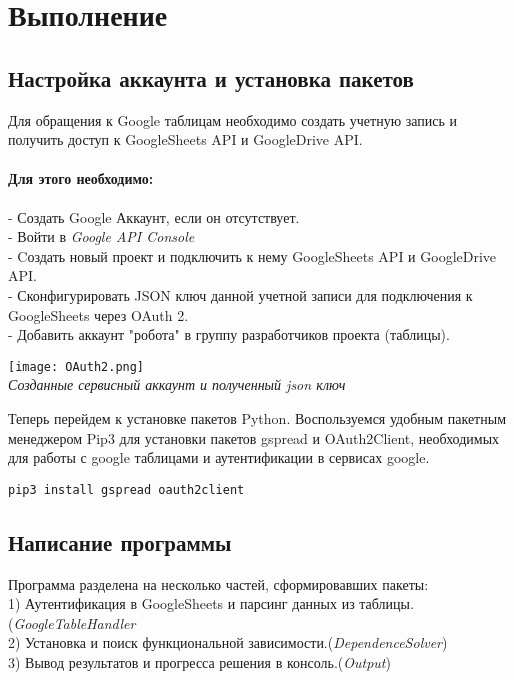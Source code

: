 \newpage
	\section*{\centering Выполнение}
	
	\subsection*{Настройка аккаунта и установка пакетов}
	Для обращения к Google таблицам необходимо создать учетную запись и получить доступ к GoogleSheets API и GoogleDrive API.\\
	
	\paragraph{Для этого необходимо:\\
	}
	- Создать Google Аккаунт, если он отсутствует.\\
	- Войти в \textit{Google API Console}\\
	- Cоздать новый проект и подключить к нему GoogleSheets API и GoogleDrive API.\\
	- Сконфигурировать JSON ключ данной учетной записи для подключения к GoogleSheets через OAuth 2.\\
	- Добавить аккаунт "робота" в группу разработчиков проекта (таблицы).\\
    \begin{center}
        \texttt{[image: OAuth2.png]}\\
        \textit{Созданные сервисный аккаунт и полученный json ключ}
    \end{center}
	
	Теперь перейдем к установке пакетов Python. Воспользуемся удобным пакетным менеджером Pip3 для установки пакетов gspread и OAuth2Client, необходимых для работы с google таблицами и аутентификации  в сервисах google.
	\begin{lstlisting}
pip3 install gspread oauth2client
    \end{lstlisting}
    
    \subsection*{Написание программы}
    Программа разделена на несколько частей, сформировавших пакеты:\\
    1) Аутентификация в GoogleSheets и парсинг данных из таблицы.(\textit{GoogleTableHandler}\\
    2) Установка и поиск функциональной зависимости.(\textit{DependenceSolver})\\
    3) Вывод результатов и прогресса решения в консоль.(\textit{Output})\\

